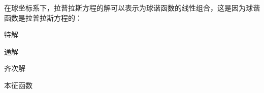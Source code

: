 \documentclass{njustexam}
\begin{document}
   
    \begin{problem}
      在球坐标系下，拉普拉斯方程的解可以表示为球谐函数的线性组合，这是因为球谐函数是拉普拉斯方程的：
      \begin{abcd}
      \item 特解
      \item 通解
      \item 齐次解
      \item 本征函数
      \end{abcd}
      \end{problem}



\end{document}
